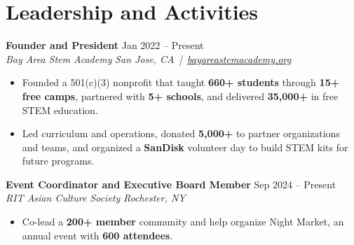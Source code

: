 \documentclass[10pt,letterpaper]{article}
\newif\ifresumeFirstRole
\newcommand{\resumeRole}[4]{%
  \ifresumeFirstRole
    \global\resumeFirstRolefalse
  \else
    \vspace{0pt plus 1fill}%
  \fi
  \textbf{#1} \hfill #2\\
  \textit{#3} \hfill \textit{#4}
}
\begin{document}
\section*{Leadership and Activities}
\resumeRole{Founder and President}{Jan 2022 -- Present}{Bay Area Stem Academy}{San Jose, CA \,|\, \href{https://bayareastemacademy.org}{bayareastemacademy.org}}
\begin{itemize}
  \item Founded a 501(c)(3) nonprofit that taught \textbf{660+ students} through \textbf{15+ free camps}, partnered with \textbf{5+ schools}, and delivered \textbf{\textdollar{}35,000+} in free STEM education.
  \item Led curriculum and operations, donated \textbf{\textdollar{}5,000+} to partner organizations and teams, and organized a \textbf{SanDisk} volunteer day to build STEM kits for future programs.
\end{itemize}

\resumeRole{Event Coordinator and Executive Board Member}{Sep 2024 -- Present}{RIT Asian Culture Society}{Rochester, NY}
\begin{itemize}
  \item Co-lead a \textbf{200+ member} community and help organize Night Market, an annual event with \textbf{600 attendees}.
\end{itemize}
\end{document}
